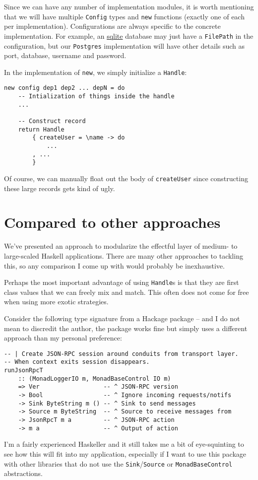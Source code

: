 Since we can have any number of implementation modules, it is worth
mentioning that we will have multiple \texttt{Config} types and
\texttt{new} functions (exactly one of each per implementation).
Configurations are always specific to the concrete implementation. For
example, an \href{https://sqlite.org/index.html}{sqlite} database may
just have a \texttt{FilePath} in the configuration, but our
\texttt{Postgres} implementation will have other details such as port,
database, username and password.

In the implementation of \texttt{new}, we simply initialize a
\texttt{Handle}:

\begin{verbatim}
new config dep1 dep2 ... depN = do
    -- Intialization of things inside the handle
    ...

    -- Construct record
    return Handle
        { createUser = \name -> do
            ...
        , ...
        }
\end{verbatim}
Of course, we can manually float out the body of \texttt{createUser}
since constructing these large records gets kind of ugly.

\section{Compared to other approaches}

We've presented an approach to modularize the effectful layer of medium-
to large-scaled Haskell applications. There are many other approaches to
tackling this, so any comparison I come up with would probably be
inexhaustive.

Perhaps the most important advantage of using \texttt{Handle}s is that
they are first class values that we can freely mix and match. This often
does not come for free when using more exotic strategies.

Consider the following type signature from a Hackage package -- and I do
not mean to discredit the author, the package works fine but simply uses
a different approach than my personal preference:

\begin{verbatim}
-- | Create JSON-RPC session around conduits from transport layer.
-- When context exits session disappears.
runJsonRpcT
    :: (MonadLoggerIO m, MonadBaseControl IO m)
    => Ver                  -- ^ JSON-RPC version
    -> Bool                 -- ^ Ignore incoming requests/notifs
    -> Sink ByteString m () -- ^ Sink to send messages
    -> Source m ByteString  -- ^ Source to receive messages from
    -> JsonRpcT m a         -- ^ JSON-RPC action
    -> m a                  -- ^ Output of action
\end{verbatim}
I'm a fairly experienced Haskeller and it still takes me a bit of
eye-squinting to see how this will fit into my application, especially
if I want to use this package with other libraries that do not use the
\texttt{Sink}/\texttt{Source} or \texttt{MonadBaseControl} abstractions.

